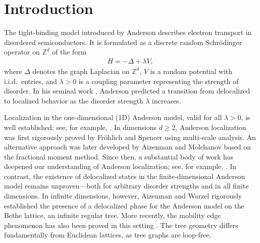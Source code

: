 \section{Introduction}


The tight-binding model introduced by Anderson \cite{Anderson} describes electron transport in disordered semiconductors. It is formulated as a discrete random Schr{\"o}dinger operator on $\mathbb{Z}^{d}$ of the form
\begin{align}\label{Anderson_orig}
H = - \Delta + \lambda V,
\end{align}
where $\Delta$ denotes the graph Laplacian on $\mathbb{Z}^{d}$, $V$ is a random potential with i.i.d.~entries, and $\lambda>0$ is a coupling parameter representing the strength of disorder. In his seminal work \cite{Anderson}, Anderson predicted a transition from delocalized to localized behavior as the disorder strength $\lambda$ increases.

Localization in the one-dimensional (1D) Anderson model, valid for all $\lambda>0$, is well established; see, for example, \cite{GMP, KunzSou, Carmona1982_Duke, Damanik2002}. In dimensions $d \geq 2$, Anderson localization was first rigorously proved by Fr{\"o}hlich and Spencer \cite{FroSpen_1983} using multi-scale analysis. An alternative approach was later developed by Aizenman and Molchanov \cite{Aizenman1993} based on the fractional moment method. Since then, a substantial body of work has deepened our understanding of Anderson localization; see, for example, \cite{FroSpen_1985, Carmona1987, SimonWolff, Aizenman1994, ASFH2001, Bourgain2005, Germinet2013, DingSmart2020, LiZhang2019}. 
In contrast, the existence of delocalized states in the finite-dimensional Anderson model remains unproven---both for arbitrary disorder strengths and in all finite dimensions. In infinite dimensions, however, Aizenman and Warzel \cite{aizenman2013resonant, Bethe_PRL} rigorously established the presence of a delocalized phase for the Anderson model on the Bethe lattice, an infinite regular tree. More recently, the mobility edge phenomenon has also been proved in this setting \cite{Bethe-Anderson}. The tree geometry differs fundamentally from Euclidean lattices, as tree graphs are loop-free.

